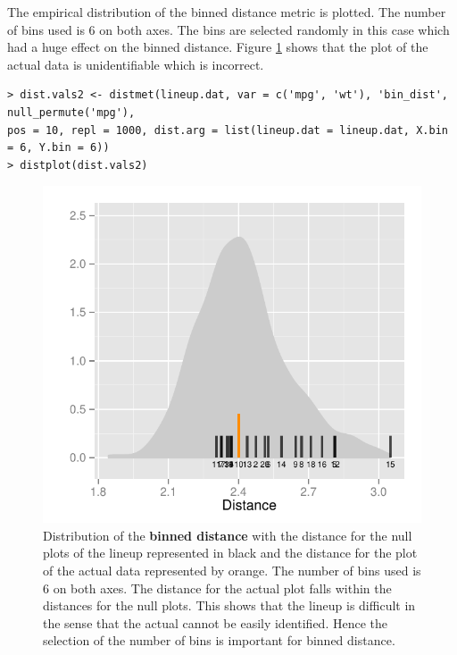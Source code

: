\newpage

The empirical distribution of the binned distance metric is plotted. The number of bins used is 6 on both axes. The bins are selected randomly in this case which had a huge effect on the binned distance. Figure \ref{dist-bin-1} shows that the plot of the actual data is unidentifiable which is incorrect. 

\begin{verbatim}
> dist.vals2 <- distmet(lineup.dat, var = c('mpg', 'wt'), 'bin_dist', null_permute('mpg'), 
pos = 10, repl = 1000, dist.arg = list(lineup.dat = lineup.dat, X.bin = 6, Y.bin = 6))
> distplot(dist.vals2)
\end{verbatim}

\begin{figure}[hbtp]
\begin{center}
\includegraphics[scale=0.7]{nullabor-distr-bin-1.pdf}
\caption{Distribution of the \textbf{binned distance} with the distance for the null plots of the lineup represented in black and the distance for the plot of the actual data represented by orange. The number of bins used is 6 on both axes. The distance for the actual plot falls within the distances for the null plots. This shows that the lineup is difficult in the sense that the actual cannot be easily identified.  Hence the selection of the number of bins is important for binned distance. }
\label{dist-bin-1}
\end{center}
\end{figure}

